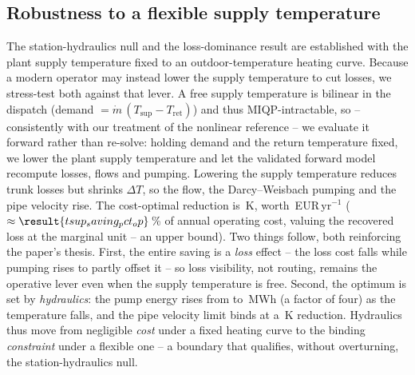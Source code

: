\documentclass[a4paper,fleqn]{cas-dc}
\begin{document}
\subsection{Robustness to a flexible supply temperature}
\label{subsec:tsup}
The station-hydraulics null and the loss-dominance result are established with the plant
supply temperature fixed to an outdoor-temperature heating curve. Because a modern operator
may instead lower the supply temperature to cut losses, we stress-test both against that
lever. A free supply temperature is bilinear in the dispatch (demand $=\dot m\,(T_\text{sup}
-T_\text{ret})$) and thus MIQP-intractable, so -- consistently with our treatment of the
nonlinear reference -- we evaluate it forward rather than re-solve: holding demand and the
return temperature fixed, we lower the plant supply temperature and let the validated forward
model recompute losses, flows and pumping. Lowering the supply temperature reduces trunk
losses but shrinks $\Delta T$, so the flow, the Darcy--Weisbach pumping and the pipe velocity
rise. The cost-optimal reduction is \,K, worth
\,EUR\,yr$^{-1}$ ($\approx\result{tsup_saving_pct_op}$\,\% of annual
operating cost, valuing the recovered loss at the marginal unit -- an upper bound). Two things
follow, both reinforcing the paper's thesis. First, the entire saving is a \emph{loss} effect
-- the loss cost falls while pumping rises to partly offset it -- so loss visibility, not
routing, remains the operative lever even when the supply temperature is free. Second, the
optimum is set by \emph{hydraulics}: the pump energy rises from  to
\,MWh (a factor of four) as the temperature falls, and the pipe
velocity limit binds at a \,K reduction. Hydraulics thus move
from negligible \emph{cost} under a fixed heating curve to the binding \emph{constraint} under
a flexible one -- a boundary that qualifies, without overturning, the station-hydraulics null.

\end{document}
